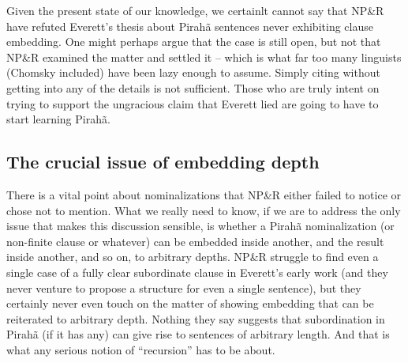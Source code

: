 \documentclass[output=paper,colorlinks,citecolor=brown
]{langscibook}
\begin{document}
Given the present state of our knowledge, we certainlt cannot say that
NP\&R have refuted Everett's thesis about Pirah{\~a} sentences never
exhibiting clause embedding. One might perhaps argue that the case
is still open, but not that NP\&R examined the matter and settled it
-- which is what far too many linguists (Chomsky included) have been
lazy enough to assume. Simply citing \citet{NevPesRod09a} without
getting into any of the details is not sufficient. Those who are truly
intent on trying to support the ungracious claim that Everett lied
are going to have to start learning Pirah{\~a}.

\subsection{The crucial issue of embedding depth}

There is a vital point about nominalizations that NP\&R either failed
to notice or chose not to mention. What we really need to know, if we
are to address the only issue that makes this discussion sensible, is
whether a Pirah{\~a} nominalization (or non-finite clause or whatever)
can be embedded inside another, and the result inside another, and so
on, to arbitrary depths. NP\&R struggle to find even a single case of
a fully clear subordinate clause in Everett's early work (and they
never venture to propose a structure for even a single sentence), but
they certainly never even touch on the matter of showing embedding that
can be reiterated to arbitrary depth. Nothing they say suggests that
subordination in Pirah{\~a} (if it has any) can give rise to sentences
of arbitrary length. And that is what any serious notion of ``recursion''
has to be about.
\end{document}
